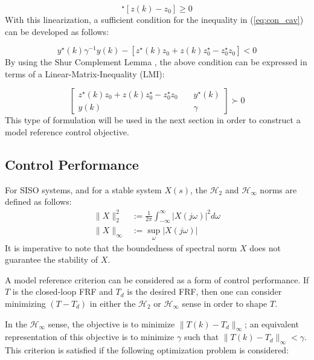 \documentclass[a4paper, 10pt, conference]{ieeeconf}
\begin{document}
\begin{equation}
[z(k)-z_0]^{\star}[z(k)-z_0] \geq 0
\end{equation}
With this linearization, a sufficient condition for the inequality in (\ref{eq:con_cav}) can be developed as follows:

\begin{equation}
y^{\star}(k) \gamma^{-1} y(k) - [z^{\star}(k)z_0 + z(k)z_0^{\star} - z_0^{\star}z_0]< 0 
\end{equation}
By using the Shur Complement Lemma \cite{BEN09}, the above condition can be expressed in terms of a Linear-Matrix-Inequality (LMI):

\begin{equation} \label{eq:LMI_1}
\begin{bmatrix}
z^{\star}(k)z_0 + z(k)z_0^{\star} - z_0^{\star}z_0 & \phantom{kk} y^{\star}(k) \\
y(k) & \phantom{kk} \gamma
\end{bmatrix}
\succ 0
\end{equation}
This type of formulation will be used in the next section in order to construct a model reference control objective. 

\subsection{Control Performance}  \label{sec:controlperformance}
For SISO systems, and for a stable system $X(s)$, the $\mathcal{H}_2$ and $\mathcal{H}_\infty$ norms are defined as follows:
\begin{align*}
\| X\|_2^2 & := \frac{1}{2\pi} \int_{- \infty}^\infty |X(j\omega)|^2 d\omega \\
\| X\|_\infty & :=  \sup_{\omega} |X(j\omega)|
\end{align*}
It is imperative to note that the boundedness of spectral norm $X$ does not guarantee the stability of $X$. 

A model reference criterion can be considered as a form of control performance. If $T$ is the closed-loop FRF and $T_d$ is the desired FRF, then one can consider minimizing $(T-T_d)$ in either the $\mathcal{H}_2$ or $\mathcal{H}_\infty$ sense in order to shape $T$. 

In the $\mathcal{H}_\infty$ sense, the objective is to minimize $ \|T(k) - T_d \|_\infty$; an equivalent representation of this objective is to minimize $\gamma$ such that $ \|T(k) - T_d \|_\infty < \gamma$. This criterion is satisfied if the following optimization problem is considered:
 
\end{document}
